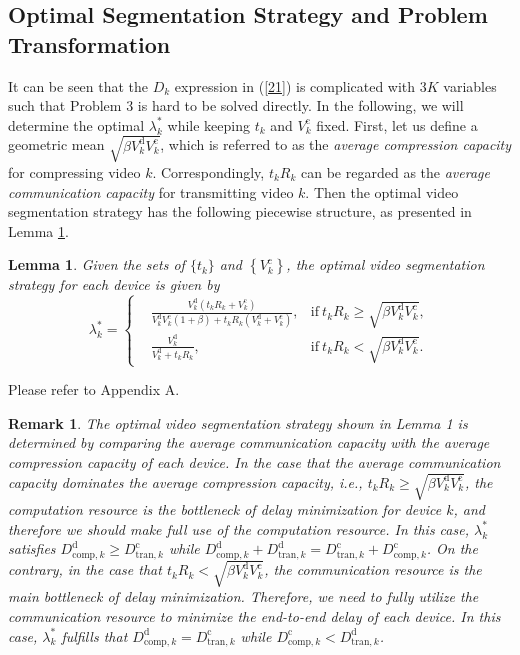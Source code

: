 \documentclass[journal,draftcls,onecolumn,12pt,twoside]{IEEEtran}
\newtheorem{rem}{Remark}
\newtheorem{lem}{Lemma}
\begin{document}
\subsection{Optimal Segmentation Strategy and Problem Transformation}
It can be seen that the $D_k$ expression in (\ref{21}) is complicated with 3$K$ variables such that Problem 3 is hard to be solved directly. In the following, we will determine the optimal $\lambda_k^{*}$ while keeping $t_k$ and $V_k^{\text{c}}$ fixed. First, let us define a geometric mean $\sqrt{\beta V_k^{\text{d}}V_k^{\text{c}}}$, which is referred to as the \emph{average compression capacity} for compressing video $k$. Correspondingly, $t_k R_k$ can be regarded as the \emph{average communication capacity} for transmitting video $k$. Then the optimal video segmentation strategy has the following piecewise structure, as presented in Lemma \ref{Lemma1}.
\begin{lem}
 Given the sets of $\{t_k\}$ and $\left\{V_k^{\text{c}}\right\}$, the optimal video segmentation strategy for each device is given by
	\begin{equation}
	\lambda_k^* =
    \left\{
	\begin{aligned}
	   &\frac{V_k^{\text{d}}\left(t_kR_k+V_k^{\text{c}}\right)}{V_k^{\text{d}}V_k^{\text{c}}(1+\beta)+t_kR_k(V_k^{\text{d}}+V_k^{\text{c}})},
            &\text{if}~t_k R_k \ge \sqrt{\beta V_k^{\text{d}} V_k^{\text{c}}},\\
	   &\frac{V_k^{\text{d}}}{V_k^{\text{d}}+t_kR_k},
            &\text{if}~t_k R_k < \sqrt{\beta V_k^{\text{d}} V_k^{\text{c}}}.\label{22}
	\end{aligned}
	\right.
	\end{equation} \label{Lemma1}
\end{lem}
\begin{IEEEproof}
	Please refer to Appendix A.
	\end{IEEEproof}
\begin{rem}
 The optimal video segmentation strategy shown in Lemma 1 is determined by comparing the \emph{average communication capacity} with the \emph{average compression capacity} of each device. In the case that the \emph{average communication capacity} dominates the \emph{average compression capacity}, i.e., $t_k R_k \ge \sqrt{\beta V_k^{\text{d}} V_k^{\text{c}}}$, the computation resource is the bottleneck of delay minimization for device $k$, and therefore we should make full use of the computation resource. In this case, $\lambda_k^*$ satisfies $D_{\text{comp},k}^{\text{d}} \ge D_{\text{tran},k}^{\text{c}}$ while $D_{\text{comp},k}^{\text{d}} + D_{\text{tran},k}^{\text{d}} = D_{\text{tran},k}^{\text{c}} + D_{\text{comp},k}^{\text{c}}$. On the contrary, in the case that $t_k R_k < \sqrt{\beta V_k^{\text{d}} V_k^{\text{c}}}$,  the communication resource is the main bottleneck of delay minimization. Therefore, we need to fully utilize the communication resource to minimize the end-to-end delay of each device. In this case, $\lambda_k^*$ fulfills that $D_{\text{comp},k}^{\text{d}} = D_{\text{tran},k}^{\text{c}}$ while $D_{\text{comp},k}^{\text{c}} < D_{\text{tran},k}^{\text{d}}$.
\end{rem}
\end{document}
